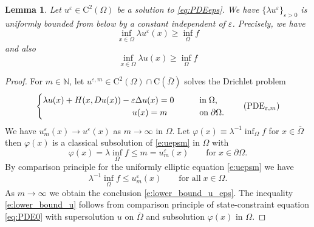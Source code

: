 \documentclass[11pt,reqno]{amsart}
\numberwithin{figure}{section}
\theoremstyle{plain}
\newtheorem{lem}[thm]{Lemma}
\theoremstyle{remark}
\numberwithin{equation}{section}
\newcommand{\rmC}{\mathrm{C}}
\begin{document}
\begin{lem}\label{lem:lower-bound} Let $u^\varepsilon\in \mathrm{C}^2(\Omega)$ be a solution to \eqref{eq:PDEeps}. We have $\{\lambda u^\varepsilon\}_{\varepsilon>0}$ is uniformly bounded from below by a constant independent of $\varepsilon$. Precisely, we have
\begin{equation}\label{e:lower_bound_u_eps}
    \inf_{x\in \Omega} \lambda u^\varepsilon(x) \geq  \inf_{\Omega} f
\end{equation}
and also
\begin{equation}\label{e:lower_bound_u}
    \inf_{x\in \Omega} \lambda u(x) \geq  \inf_{\Omega} f
\end{equation}
\end{lem}
\begin{proof} For $m\in \mathbb{N}$, let $u^{\varepsilon,m}\in \mathrm{C}^2(\Omega)\cap \rmC(\overline{\Omega})$ solves the Drichlet problem
\begin{equation}\label{e:uepsm}
    \begin{cases}
    \lambda u(x) + H(x,Du(x)) - \varepsilon \Delta u(x) = 0 &\qquad
    \text{in}\;\Omega, \vspace{0cm}\\
    \;\;\quad\quad\qquad\qquad\qquad\qquad u(x) = m &\qquad
    \text{on}\;\partial\Omega.
    \end{cases} \tag{PDE$_{\varepsilon,m}$}
\end{equation}
We have $u^{\varepsilon}_m(x) \to u^\varepsilon(x)$ as $m\to \infty$ in $\Omega$. Let $\varphi(x) \equiv \lambda^{-1} \inf_{\Omega} f$ for $x\in \overline{\Omega}$ then $\varphi(x)$ is a classical subsolution of \eqref{e:uepsm} in $\Omega$ with
\begin{equation*}
    \varphi(x) = \lambda \inf_\Omega f \leq m = u^\varepsilon_m(x) \qquad\text{for}\;x\in \partial\Omega.
\end{equation*}
By comparison principle for the uniformly elliptic equation \eqref{e:uepsm} we have
\begin{equation*}
    \lambda^{-1}\inf_\Omega f \leq u^{\varepsilon}_m(x) \qquad\text{for all}\;x\in \Omega.
\end{equation*}
As $m\to \infty$ we obtain the conclusion \eqref{e:lower_bound_u_eps}. The inequality \eqref{e:lower_bound_u} follows from comparison principle of state-constraint equation \eqref{eq:PDE0} with supersolution $u$ on $\overline{\Omega}$ and subsolution $\varphi(x)$ in $\Omega$.
\end{proof}
\end{document}
